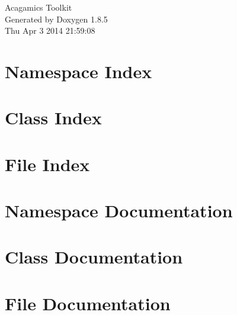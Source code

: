 \documentclass[twoside]{book}
\newcommand{\clearemptydoublepage}{%
  \newpage{\pagestyle{empty}\cleardoublepage}%
}
\begin{document}
\hypersetup{pageanchor=false}
\begin{titlepage}
\vspace*{7cm}
\begin{center}%
{\Large Acagamics Toolkit }\\
\vspace*{1cm}
{\large Generated by Doxygen 1.8.5}\\
\vspace*{0.5cm}
{\small Thu Apr 3 2014 21:59:08}\\
\end{center}
\end{titlepage}
\clearemptydoublepage
\tableofcontents
\clearemptydoublepage
{}
\hypersetup{pageanchor=true}

\chapter{Namespace Index}

\chapter{Class Index}

\chapter{File Index}

\chapter{Namespace Documentation}

\chapter{Class Documentation}











\chapter{File Documentation}











\newpage
{}
{}
\printindex
\end{document}
